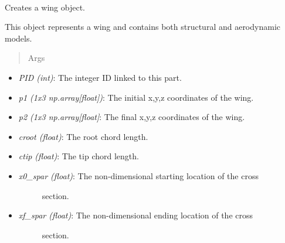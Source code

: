 \documentclass[letterpaper,10pt,english]{sphinxmanual}
\begin{document}
\begin{fulllineitems}
\label{AircraftParts:AeroComBAT.AircraftParts.Wing}~

\begin{fulllineitems}
\label{AircraftParts:AeroComBAT.AircraftParts.Wing.__init__}
Creates a wing object.

This object represents a wing and contains both structural and
aerodynamic models.
\begin{quote}\begin{description}
\item[{Args}] \leavevmode
\end{description}\end{quote}
\begin{itemize}
\item {} 
\emph{PID (int)}: The integer ID linked to this part.

\item {} 
\emph{p1 (1x3 np.array{[}float{]})}: The initial x,y,z coordinates of the wing.

\item {} 
\emph{p2 (1x3 np.array{[}float{]}}: The final x,y,z coordinates of the wing.

\item {} 
\emph{croot (float)}: The root chord length.

\item {} 
\emph{ctip (float)}: The tip chord length.

\item {} \begin{description}
\item[{\emph{x0\_spar (float)}: The non-dimensional starting location of the cross}] \leavevmode
section.

\end{description}

\item {} \begin{description}
\item[{\emph{xf\_spar (float)}: The non-dimensional ending location of the cross}] \leavevmode
section.


\end{description}
\end{itemize}
\end{fulllineitems}
\end{fulllineitems}
\end{document}
